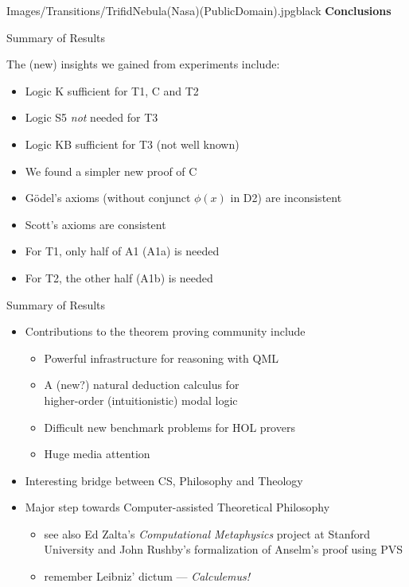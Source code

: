 
\begin{transitionframe}{Images/Transitions/TrifidNebula(Nasa)(PublicDomain).jpg}{black}
\textbf{Conclusions}
\end{transitionframe}



\begin{frame}{Summary of Results} \large

The (\alert{new}) insights we gained from experiments include:\\[.5em]
\begin{itemize}
\item Logic K sufficient for T1, C and T2 
\item Logic S5 \emph{not} needed for T3
\item \alert{Logic KB sufficient for T3 (not well known)}
\item \alert{We found a simpler new proof of C}
\item \alert{G\"odel's axioms (without conjunct $\phi(x)$ in D2) are inconsistent}
\item Scott's axioms are consistent
\item For T1, only half of A1 (A1a) is needed 
\item For T2, the other half (A1b) is needed
\end{itemize}
\end{frame}


\begin{frame}{Summary of Results} \large

\begin{itemize}
\item Contributions to the theorem proving community include \\[.5em]
\begin{itemize}
\item Powerful infrastructure for reasoning with QML
\item A (new?) natural deduction calculus for \\ higher-order (intuitionistic) modal logic
\item Difficult new benchmark problems for HOL provers
\item Huge media attention
\end{itemize}

\item Interesting bridge between CS, Philosophy and Theology

\item Major step towards \alert{Computer-assisted Theoretical Philosophy}
 \begin{itemize}
  \item see also Ed Zalta's \emph{Computational Metaphysics} project at Stanford University and John Rushby's formalization of Anselm's proof using PVS
  \item remember Leibniz' dictum --- \emph{Calculemus!}
  \end{itemize}
\end{itemize}
\end{frame}

